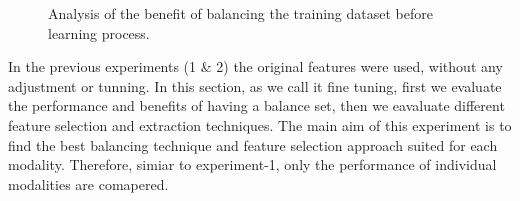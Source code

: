 \begin{landscape}
\begin{figure}
  \hfill
  \hspace*{\fill}
  \caption[Analysis of the benefit of balancing the training dataset before learning process.]{Analysis of the benefit of balancing the training dataset before learning process.}
  \label{fig:res-Ex3-bal}
\end{figure}

\end{landscape}

In the previous experiments (1 \& 2) the original features were used, without any adjustment or tunning. 
In this section, as we call it fine tuning, first we evaluate the performance and benefits of having a balance set, then we eavaluate different feature selection and extraction techniques.
The main aim of this experiment is to find the best balancing technique and feature selection approach suited for each modality. 
Therefore, simiar to experiment-1, only the performance of individual modalities are comapered. 

